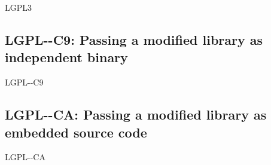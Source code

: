 \begin{license}{LGPL3}
\subsection{LGPL-\ver-C9: Passing a modified library as independent binary}
\begin{lsuc}{LGPL-\ver-C9}

  \useCaseNine

  \begin{lsucrequires}
    \lsucmandatory{\keepLicensingElements}
    \lsucmandatory{\lgplthreeEnsureCopyrightNoticeBinary}
    \lsucmandatory{\giveLicense}\passingFilesCorrectly
    \lsucmandatory{\retainCopyrightNotices}  
    \lsucmandatory{\makeModifiedSourceAvailable}
    \lsucmandatory{\describeHowToGetSource}
    \lsucmandatory{\markLibraryModifications}
    \lsucmandatory{\arrangeLibraryChanges}\howToApplyTheseTerms
    \lsucoptional{\createChangelog}
    \lsucoptional{\addToDocumentation}  
  \end{lsucrequires}

  \begin{lsucprohibits}
    \lsucitem{\noPatentLitigation}
  \end{lsucprohibits}
\end{lsuc}

\subsection{LGPL-\ver-CA: Passing a modified library as embedded source code}
\begin{lsuc}{LGPL-\ver-CA}

  \useCaseA

  \begin{lsucrequires}
    \lsucmandatory{\keepLicensingElements}
    \lsucmandatory{\lgplthreeEnsureCopyrightNoticeSource}
    \lsucmandatory{\giveLicense}\passingFilesCorrectly
    \lsucmandatory{\addToCopyrightDialogLibWeak}
    \lsucmandatory{\markEmbeddedModifications}
    \lsucmandatory{\arrangeEmbeddedChanges}\howToApplyTheseTerms
    \lsucmandatory{\keepStructuralIndependence}
    \lsucoptional{\createChangelog}  
    \lsucoptional{\addToDocumentation}
    \lsucoptional{\retainCopyrightNotices}
  \end{lsucrequires}

  \begin{lsucprohibits}
    \lsucitem{\noPatentLitigation}
  \end{lsucprohibits}
\end{lsuc}


\end{license}
